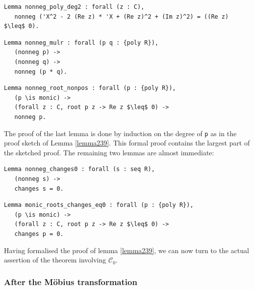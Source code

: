 \documentclass[11pt, a4paper]{article}
\newcommand{\ssc}{{\mathcal C}}
\begin{document}
\begin{lstlisting}
Lemma nonneg_poly_deg2 : forall (z : C),
   nonneg ('X^2 - 2 (Re z) * 'X + (Re z)^2 + (Im z)^2) = ((Re z) $\leq$ 0).
\end{lstlisting}

\begin{lstlisting}
Lemma nonneg_mulr : forall (p q : {poly R}),
   (nonneg p) ->
   (nonneg q) ->
   nonneg (p * q).
\end{lstlisting}

\begin{lstlisting}
Lemma nonneg_root_nonpos : forall (p : {poly R}),
   (p \is monic) ->
   (forall z : C, root p z -> Re z $\leq$ 0) ->
   nonneg p.
\end{lstlisting}
The proof of the last lemma is done by induction on the degree of \lstinline!p! as in the proof sketch of Lemma \ref{lemma239}. This formal proof contains the largest part of the sketched proof. The remaining two lemmas are almost immediate:
\begin{lstlisting}
Lemma nonneg_changes0 : forall (s : seq R),
   (nonneg s) ->
   changes s = 0.
\end{lstlisting}

\begin{lstlisting}
Lemma monic_roots_changes_eq0 : forall (p : {poly R}),
   (p \is monic) ->
   (forall z : C, root p z -> Re z $\leq$ 0) ->
   changes p = 0.
\end{lstlisting}

Having formalised the proof of lemma \ref{lemma239}, we can now turn to the actual assertion of the theorem involving $\ssc_0$.

\subsubsection{After the M\"obius transformation}
\end{document}
